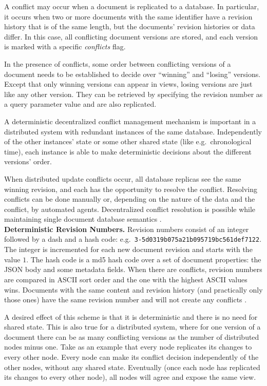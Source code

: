 A conflict may occur when a document is replicated to a database. In particular, it occurs when two or more documents with the same identifier have a revision history that is of the same length, but the documents' revision histories or data differ. In this case, all conflicting document versions are stored, and each version is marked with a specific \emph{conflicts} flag.

In the presence of conflicts, some order between conflicting versions of a document needs to be established to decide over ``winning'' and ``losing'' versions. Except that only winning versions can appear in views, losing versions are just like any other version. They can be retrieved by specifying the revision number as a query parameter value and are also replicated.

A deterministic decentralized conflict management mechanism is important in a distributed system with redundant instances of the same database. Independently of the other instances' state or some other shared state (like e.g.\ chronological time), each instance is able to make deterministic decisions about the different versions' order.

When distributed update conflicts occur, all database replicas see the same winning revision, and each has the opportunity to resolve the conflict. Resolving conflicts can be done manually or, depending on the nature of the data and the conflict, by automated agents. Decentralized conflict resolution is possible while maintaining single document database semantics \cite{Apa10}.\\

\noindent
{\bf Deterministic Revision Numbers.} Revision numbers consist of an integer followed by a dash and a hash code: e.g.\ {\tt 3-5d0319b075a21b095719bc561def7122}. The integer is incremented for each new document revision and starts with the value $1$. The hash code is a md5 hash code over a set of document properties: the JSON body and some metadata fields. When there are conflicts, revision numbers are compared in ASCII sort order and the one with the highest ASCII values wins. Documents with the same content and revision history (and practically only those ones) have the same revision number and will not create any conflicts \cite[p.~153ff]{ASL10}.

A desired effect of this scheme is that it is deterministic and there is no need for shared state. This is also true for a distributed system, where for one version of a document there can be as many conflicting versions as the number of distributed nodes minus one. Take as an example that every node replicates its changes to every other node. Every node can make its conflict decision independently of the other nodes, without any shared state. Eventually (once each node has replicated its changes to every other node), all nodes will agree and expose the same view.
